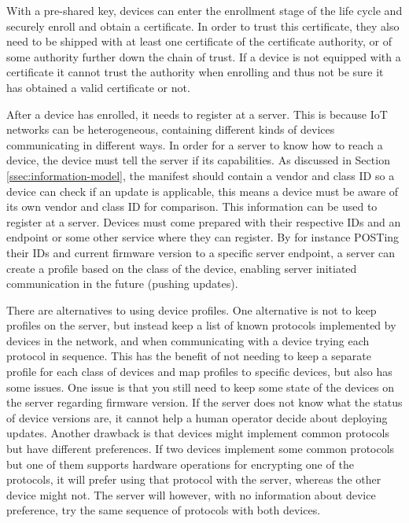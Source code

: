 \documentclass[0-thesis.tex]{subfiles}
\begin{document}
With a pre-shared key, devices can enter the enrollment stage of the life cycle and
securely enroll and obtain a certificate. In order to trust this certificate, they also
need to be shipped with at least one certificate of the certificate authority, or of some
authority further down the chain of trust. If a device is not equipped with a certificate
it cannot trust the authority when enrolling and thus not be sure it has obtained a valid
certificate or not.

After a device has enrolled, it needs to register at a server. This is because IoT
networks can be heterogeneous, containing different kinds of devices communicating in
different ways. In order for a server to know how to reach a device, the device must tell
the server if its capabilities. As discussed in Section \ref{ssec:information-model}, the
manifest should contain a vendor and class ID so a device can check if an update is
applicable, this means a device must be aware of its own vendor and class ID for
comparison. This information can be used to register at a server. Devices must come
prepared with their respective IDs and an endpoint or some other service where they can
register. By for instance POSTing their IDs and current firmware version to a specific
server endpoint, a server can create a profile based on the class of the device, enabling
server initiated communication in the future (pushing updates).

There are alternatives to using device profiles. One alternative is not to keep profiles
on the server, but instead keep a list of known protocols implemented by devices in the
network, and when communicating with a device trying each protocol in sequence. This has
the benefit of not needing to keep a separate profile for each class of devices and map
profiles to specific devices, but also has some issues. One issue is that you still need
to keep some state of the devices on the server regarding firmware version. If the server
does not know what the status of device versions are, it cannot help a human operator
decide about deploying updates. Another drawback is that devices might implement common
protocols but have different preferences. If two devices implement some common protocols
but one of them supports hardware operations for encrypting one of the protocols, it will
prefer using that protocol with the server, whereas the other device might not. The server
will however, with no information about device preference, try the same sequence of
protocols with both devices. 
\end{document}
